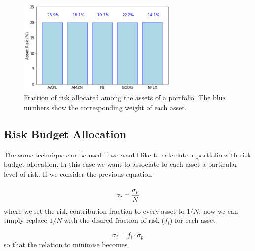 \begin{figure}[htb]
	\centering
	\includegraphics[width=0.7\textwidth]{figures/risk_parity}
	\caption{Fraction of risk allocated among the assets of a portfolio. The blue numbers show the corresponding weight of each asset.}
	\label{fig:risk_parity}
\end{figure}

\subsection{Risk Budget Allocation}
\label{risk-budget-allocation}

The same technique can be used if we would like to calculate a portfolio
with risk budget allocation. In this case we want to associate to each asset a particular level of risk. If we consider the previous equation

\begin{equation} 
\sigma _{i}=\cfrac{\sigma_p}{N} 
\end{equation}
where we set the risk contribution fraction to every asset to \(1/N\);
now we can simply replace \(1/N\) with the desired fraction of risk (\(f_i\)) for each asset

\begin{equation} 
\sigma _{i}=f_i \cdot \sigma_p 
\end{equation}
so that the relation to minimise becomes

